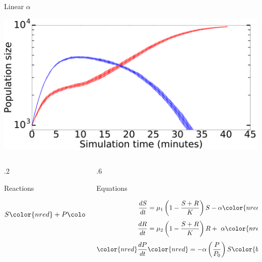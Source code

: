 \documentclass[final]{beamer}
\newlength{\onecolwid}
\newlength{\figwid}
\begin{document}
\begin{frame}[t]
\begin{block}
\begin{columns}[t]
\begin{column}{\onecolwid}
\begin{block}{Linear $\alpha$}
\begin{center}
      \includegraphics[width=\figwid]{../dev/graphics/poster/linear_pop.pdf}
    \end{center}

    \begin{columns}[t]
      \begin{column}{.2\onecolwid}
        \begin{center}
          Reactions
        \end{center}
        \begin{align*}
          S &\rightarrow 2S \\
          S \color{nred}+ P\color{black} &\rightarrow  R \\[0.8ex]
          R &\rightarrow 2R \\
          R &\rightarrow \varnothing
        \end{align*}
      \end{column}
        \vrule
      \begin{column}{.6\onecolwid}
        \begin{center}
          Equations
        \end{center}

        \begin{align*}
          \frac{dS}{dt} & = \mu_1 \left(1 - \frac{S + R}{K}\right)S - \alpha
            \color{nred}\left( \frac{P}{P_0} \right)\color{black} S \\[0.8ex]
          \frac{dR}{dt} & = \mu_2 \left(1 - \frac{S + R}{K}\right)R + \
            \alpha \color{nred}\left( \frac{P}{P_0} \right)\color{black} S - \delta R \\[0.8ex]
          \color{nred} \frac{dP}{dt} & \color{nred} = -\alpha \left( \frac{P}{P_0} \right) S \color{black}
        \end{align*}
      \end{column}
    \end{columns}
  \end{block}
\end{column}



\end{columns}
\end{block}
\end{frame}
\end{document}
